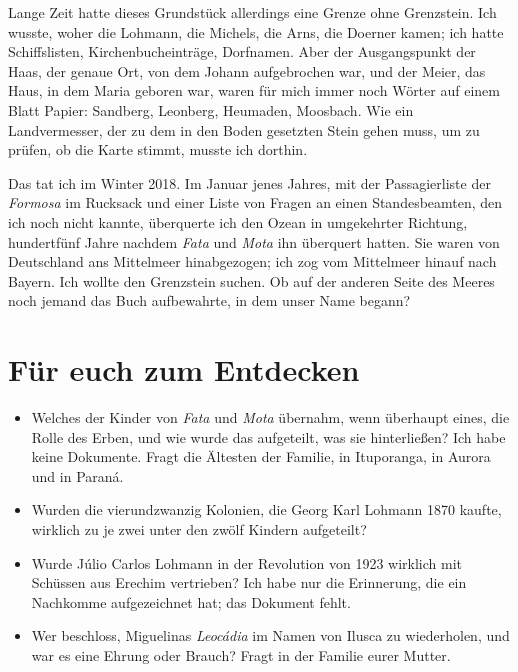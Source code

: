 \documentclass[
  ngerman,
  11pt,
  openany]{book}
\providecommand{\tightlist}{%
  \setlength{\itemsep}{0pt}\setlength{\parskip}{0pt}}
\begin{document}
Lange Zeit hatte dieses Grundstück allerdings eine Grenze ohne
Grenzstein. Ich wusste, woher die Lohmann, die Michels, die Arns, die
Doerner kamen; ich hatte Schiffslisten, Kirchenbucheinträge, Dorfnamen.
Aber der Ausgangspunkt der Haas, der genaue Ort, von dem Johann
aufgebrochen war, und der Meier, das Haus, in dem Maria geboren war,
waren für mich immer noch Wörter auf einem Blatt Papier: Sandberg,
Leonberg, Heumaden, Moosbach. Wie ein Landvermesser, der zu dem in den
Boden gesetzten Stein gehen muss, um zu prüfen, ob die Karte stimmt,
musste ich dorthin.

Das tat ich im Winter 2018. Im Januar jenes Jahres, mit der
Passagierliste der \emph{Formosa} im Rucksack und einer Liste von Fragen
an einen Standesbeamten, den ich noch nicht kannte, überquerte ich den
Ozean in umgekehrter Richtung, hundertfünf Jahre nachdem \emph{Fata} und
\emph{Mota} ihn überquert hatten. Sie waren von Deutschland ans
Mittelmeer hinabgezogen; ich zog vom Mittelmeer hinauf nach Bayern. Ich
wollte den Grenzstein suchen. Ob auf der anderen Seite des Meeres noch
jemand das Buch aufbewahrte, in dem unser Name begann?

\section{Für euch zum Entdecken}\label{fuxfcr-euch-zum-entdecken-14}

\begin{itemize}
\tightlist
\item
  Welches der Kinder von \emph{Fata} und \emph{Mota} übernahm, wenn
  überhaupt eines, die Rolle des Erben, und wie wurde das aufgeteilt,
  was sie hinterließen? Ich habe keine Dokumente. Fragt die Ältesten der
  Familie, in Ituporanga, in Aurora und in Paraná.
\item
  Wurden die vierundzwanzig Kolonien, die Georg Karl Lohmann 1870
  kaufte, wirklich zu je zwei unter den zwölf Kindern aufgeteilt?
\item
  Wurde Júlio Carlos Lohmann in der Revolution von 1923 wirklich mit
  Schüssen aus Erechim vertrieben? Ich habe nur die Erinnerung, die ein
  Nachkomme aufgezeichnet hat; das Dokument fehlt.
\item
  Wer beschloss, Miguelinas \emph{Leocádia} im Namen von Ilusca zu
  wiederholen, und war es eine Ehrung oder Brauch? Fragt in der Familie
  eurer Mutter.
\end{itemize}
\end{document}
